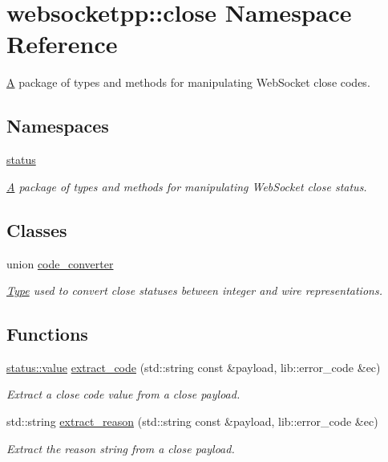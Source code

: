 \hypertarget{namespacewebsocketpp_1_1close}{}\section{websocketpp\+:\+:close Namespace Reference}
\label{namespacewebsocketpp_1_1close}


\mbox{\hyperlink{struct_a}{A}} package of types and methods for manipulating Web\+Socket close codes.  


\subsection*{Namespaces}
\begin{DoxyCompactItemize}
\item 
 \mbox{\hyperlink{namespacewebsocketpp_1_1close_1_1status}{status}}
\begin{DoxyCompactList}\small\item\em \mbox{\hyperlink{struct_a}{A}} package of types and methods for manipulating Web\+Socket close status\textquotesingle{}. \end{DoxyCompactList}\end{DoxyCompactItemize}
\subsection*{Classes}
\begin{DoxyCompactItemize}
\item 
union \mbox{\hyperlink{unionwebsocketpp_1_1close_1_1code__converter}{code\+\_\+converter}}
\begin{DoxyCompactList}\small\item\em \mbox{\hyperlink{struct_type}{Type}} used to convert close statuses between integer and wire representations. \end{DoxyCompactList}\end{DoxyCompactItemize}
\subsection*{Functions}
\begin{DoxyCompactItemize}
\item 
\mbox{\hyperlink{namespacewebsocketpp_1_1close_1_1status_a8614a5c4733d708e2d2a32191c5bef84}{status\+::value}} \mbox{\hyperlink{namespacewebsocketpp_1_1close_aa47dacf7d2e13705d1f68d9ab5b9dad0}{extract\+\_\+code}} (std\+::string const \&payload, lib\+::error\+\_\+code \&ec)
\begin{DoxyCompactList}\small\item\em Extract a close code value from a close payload. \end{DoxyCompactList}\item 
std\+::string \mbox{\hyperlink{namespacewebsocketpp_1_1close_a537f66833c7b6e745b3cf5dc0252c0ca}{extract\+\_\+reason}} (std\+::string const \&payload, lib\+::error\+\_\+code \&ec)
\begin{DoxyCompactList}\small\item\em Extract the reason string from a close payload. \end{DoxyCompactList}\end{DoxyCompactItemize}


